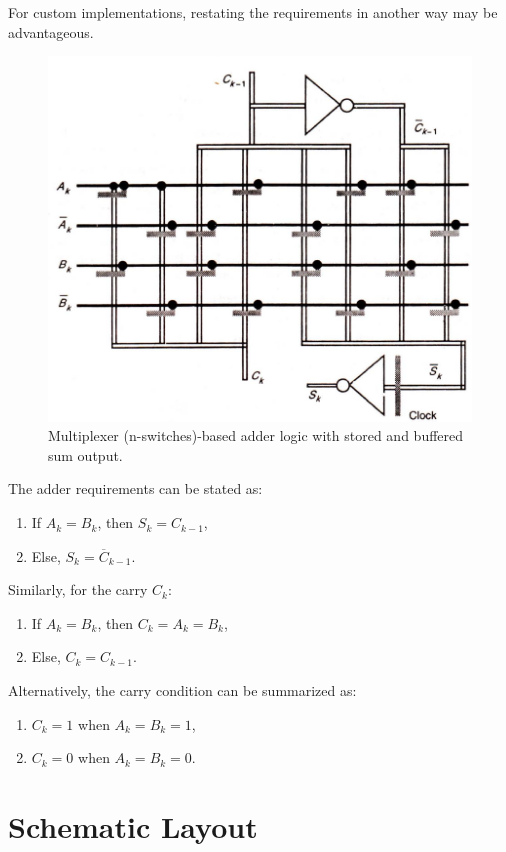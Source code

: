 \documentclass[a4paper,12pt]{article}
\begin{document}
	For custom implementations, restating the requirements in another way may be advantageous. 
	\begin{figure}[H]
		\centering
		\includegraphics[width=0.89\linewidth]{Images/1}
		\caption{Multiplexer (n-switches)-based adder logic with stored and buffered sum output.}
		\label{fig:sk}
	\end{figure}
	The adder requirements can be stated as:
	
	\begin{enumerate}
		\item If $A_k = B_k$, then $S_k = C_{k-1}$,
		\item Else, $S_k = \overline{C}_{k-1}$.
	\end{enumerate}
	
	Similarly, for the carry $C_k$:
	
	\begin{enumerate}
		\item If $A_k = B_k$, then $C_k = A_k = B_k$,
		\item Else, $C_k = C_{k-1}$.
	\end{enumerate}
	
	Alternatively, the carry condition can be summarized as:
	
	\begin{enumerate}
		\item $C_k = 1$ when $A_k = B_k = 1$,
		\item $C_k = 0$ when $A_k = B_k = 0$.
	\end{enumerate}
	\newpage
	\section{Schematic Layout }
	
\end{document}
